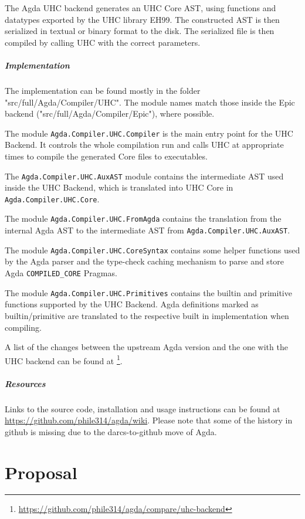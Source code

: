 \documentclass[12pt, a4paper, twoside]{report}
\begin{document}
The Agda UHC backend generates an UHC Core AST, using functions and datatypes exported
by the UHC library EH99. The constructed AST is then serialized in textual or binary format
to the disk. The serialized file is then compiled by calling UHC with the correct parameters.

\paragraph{Implementation}
The implementation can be found mostly in the folder "src/full/Agda/Compiler/UHC". The module
names match those inside the Epic backend ("src/full/Agda/Compiler/Epic"), where possible.

The module \texttt{Agda.Compiler.UHC.Compiler} is the main entry point for the UHC Backend.
It controls the whole compilation run and calls UHC at appropriate times to compile the
generated Core files to executables.

The \texttt{Agda.Compiler.UHC.AuxAST} module contains the intermediate AST used inside the UHC Backend,
which is translated into UHC Core in \texttt{Agda.Compiler.UHC.Core}.

The module \texttt{Agda.Compiler.UHC.FromAgda} contains the translation from the internal Agda AST
to the intermediate AST from \texttt{Agda.Compiler.UHC.AuxAST}.

The module \texttt{Agda.Compiler.UHC.CoreSyntax} contains some helper functions used by
the Agda parser and the type-check caching mechanism to parse and store Agda \texttt{COMPILED_CORE} Pragmas.

The module \texttt{Agda.Compiler.UHC.Primitives} contains the builtin and primitive functions
supported by the UHC Backend. Agda definitions marked as builtin/primitive are translated
to the respective built in implementation when compiling.

A list of the changes between the upstream Agda version and the one with the UHC backend can be found at \footnote{\url{https://github.com/phile314/agda/compare/uhc-backend}}.

\paragraph{Resources}
Links to the source code, installation and usage instructions can be found
at \url{https://github.com/phile314/agda/wiki}. Please note that some of the
history in github is missing due to the darcs-to-github move of Agda.

\chapter{Proposal}
\label{chp:proposal}
\end{document}
